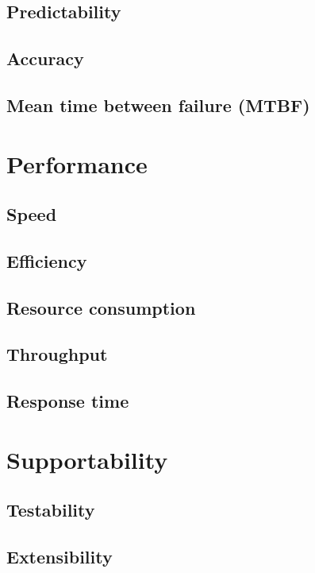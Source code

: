 \documentclass[11pt,a4paper,oneside,svgnames]{report}
\begin{document}
\subsection{Predictability}

\subsection{Accuracy}

\subsection{Mean time between failure (MTBF)}

\section{Performance}

\subsection{Speed}

\subsection{Efficiency}

\subsection{Resource consumption}

\subsection{Throughput}

\subsection{Response time}


\section{Supportability}

\subsection{Testability}

\subsection{Extensibility}
\end{document}
